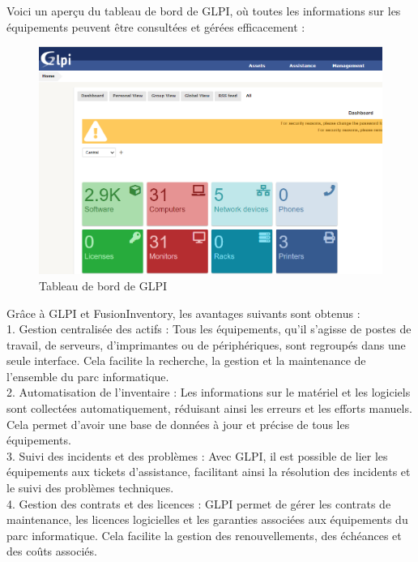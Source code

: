 Voici un aperçu du tableau de bord de GLPI, où toutes les informations sur les équipements peuvent être consultées et gérées efficacement : \\

\begin{figure}[H]
\centering
\includegraphics[width=15cm]{Images/GLPI.png}
\caption{Tableau de bord de GLPI}
\label{fig:glpi-dashboard}
\end{figure}

Grâce à GLPI et FusionInventory, les avantages suivants sont obtenus : \\

1. Gestion centralisée des actifs : Tous les équipements, qu'il s'agisse de postes de travail, de serveurs, d'imprimantes ou de périphériques, sont regroupés dans une seule interface. Cela facilite la recherche, la gestion et la maintenance de l'ensemble du parc informatique. \\

2. Automatisation de l'inventaire : Les informations sur le matériel et les logiciels sont collectées automatiquement, réduisant ainsi les erreurs et les efforts manuels. Cela permet d'avoir une base de données à jour et précise de tous les équipements. \\

3. Suivi des incidents et des problèmes : Avec GLPI, il est possible de lier les équipements aux tickets d'assistance, facilitant ainsi la résolution des incidents et le suivi des problèmes techniques. \\

4. Gestion des contrats et des licences : GLPI permet de gérer les contrats de maintenance, les licences logicielles et les garanties associées aux équipements du parc informatique. Cela facilite la gestion des renouvellements, des échéances et des coûts associés. \\

